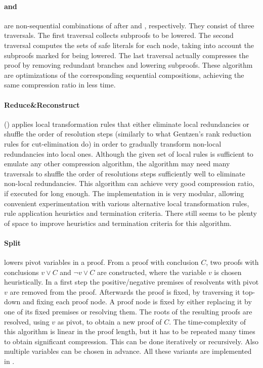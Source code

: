 \documentclass{llncs}
\begin{document}
\paragraph{ and } are non-sequential combinations of  after 
and , respectively. They consist of three traversals. The first traversal collects subproofs to be
lowered. The second traversal computes the sets of safe literals for each node,
taking into account the subproofs marked for being lowered. The last traversal actually compresses the proof by removing redundant branches and lowering subproofs. These algorithm are optimizations of the corresponding sequential compositions, achieving the
same compression ratio in less time. 


\paragraph{Reduce\&Reconstruct} () \cite{RedRec} applies local transformation
rules that either eliminate local redundancies or shuffle the order of resolution steps (similarly to what Gentzen's rank reduction rules for cut-elimination do) in order to gradually transform non-local redundancies into local ones. Although the given set of local rules is sufficient to emulate any
other compression algorithm, the algorithm may need many traversals to shuffle the order of resolutions steps sufficiently well to eliminate non-local redundancies. This algorithm can achieve very good
compression ratio, if executed for long enough.
%
The implementation in \skeptik is very modular, allowing convenient experimentation with various alternative local transformation rules, rule application heuristics and termination criteria. There still seems to be plenty of space to improve heuristics and termination criteria for this algorithm.


\paragraph{Split} \cite{CottonSplit} lowers pivot variables in a proof. 
From a proof with conclusion $C$, two proofs with conclusions $v \vee C$ and $\neg{v} \vee C$ are constructed,  where the variable $v$ is chosen heuristically.
In a first step the positive/negative premises of resolvents with pivot $v$ are removed from the proof.
Afterwards the proof is fixed, by traversing it top-down and fixing each proof node.
A proof node is fixed by either replacing it by one of its fixed premises or resolving them.
The roots of the resulting proofs are resolved, using $v$ as pivot, to obtain a new proof of $C$.
The time-complexity of this algorithm is linear in the proof length, but it has to be repeated many times to obtain significant compression. This can be done iteratively or recursively. Also multiple variables can be chosen in advance. 
All these variants are implemented in {\skeptik}.
\end{document}

